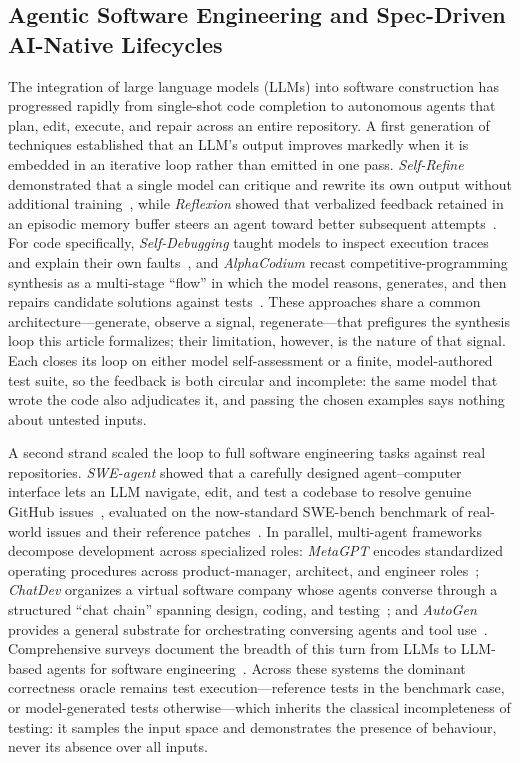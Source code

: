 \subsection{Agentic Software Engineering and Spec-Driven AI-Native Lifecycles}
\label{subsec:rw1}

The integration of large language models (LLMs) into software construction has progressed rapidly from single-shot code completion to autonomous agents that plan, edit, execute, and repair across an entire repository. A first generation of techniques established that an LLM's output improves markedly when it is embedded in an iterative loop rather than emitted in one pass. \emph{Self-Refine} demonstrated that a single model can critique and rewrite its own output without additional training~\cite{madaan2023selfrefine}, while \emph{Reflexion} showed that verbalized feedback retained in an episodic memory buffer steers an agent toward better subsequent attempts~\cite{shinn2023reflexion}. For code specifically, \emph{Self-Debugging} taught models to inspect execution traces and explain their own faults~\cite{chen2024selfdebug}, and \emph{AlphaCodium} recast competitive-programming synthesis as a multi-stage ``flow'' in which the model reasons, generates, and then repairs candidate solutions against tests~\cite{ridnik2024alphacodium}. These approaches share a common architecture---generate, observe a signal, regenerate---that prefigures the synthesis loop this article formalizes; their limitation, however, is the nature of that signal. Each closes its loop on either model self-assessment or a finite, model-authored test suite, so the feedback is both circular and incomplete: the same model that wrote the code also adjudicates it, and passing the chosen examples says nothing about untested inputs.

A second strand scaled the loop to full software engineering tasks against real repositories. \emph{SWE-agent} showed that a carefully designed agent--computer interface lets an LLM navigate, edit, and test a codebase to resolve genuine GitHub issues~\cite{yang2024sweagent}, evaluated on the now-standard SWE-bench benchmark of real-world issues and their reference patches~\cite{jimenez2024swebench}. In parallel, multi-agent frameworks decompose development across specialized roles: \emph{MetaGPT} encodes standardized operating procedures across product-manager, architect, and engineer roles~\cite{hong2024metagpt}; \emph{ChatDev} organizes a virtual software company whose agents converse through a structured ``chat chain'' spanning design, coding, and testing~\cite{qian2024chatdev}; and \emph{AutoGen} provides a general substrate for orchestrating conversing agents and tool use~\cite{wu2024autogen}. Comprehensive surveys document the breadth of this turn from LLMs to LLM-based agents for software engineering~\cite{liu2024llmagentse}. Across these systems the dominant correctness oracle remains test execution---reference tests in the benchmark case, or model-generated tests otherwise---which inherits the classical incompleteness of testing: it samples the input space and demonstrates the presence of behaviour, never its absence over all inputs.

